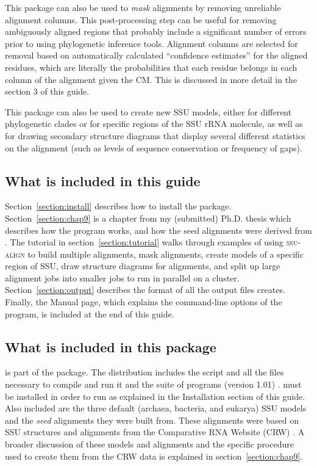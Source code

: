 This package can also be used to \emph{mask} alignments by removing
unreliable alignment columns. This post-processing step can be useful
for removing ambiguously aligned regions that probably include a
significant number of errors prior to using phylogenetic inference
tools.  Alignment columns are selected for removal based on
automatically calculated ``confidence estimates'' for the aligned
residues, which are literally the probabilities that each residue belongs
in each column of the alignment given the CM. This is discussed in
more detail in the section 3 of this guide.

This package can also be used to create new SSU models, either for
different phylogenetic clades or for specific regions of the SSU rRNA
molecule, as well as for drawing secondary structure diagrams that
display several different statistics on the alignment (such as levels
of sequence conservation or frequency of gaps). 

\subsection{What is included in this guide}

Section~\ref{section:install} describes how to install the
package. Section~\ref{section:chap9} is a chapter from my (submitted)
Ph.D. thesis \cite{Nawrocki09b} which describes how the program works,
and how the seed alignments were derived from 
\cite{CannoneGutell02}.  The tutorial in
section~\ref{section:tutorial} walks through examples of using
\textsc{ssu-align} to build multiple alignments, mask alignments,
create models of a specific region of SSU, draw structure diagrams for
alignments, and split up large alignment jobs into smaller jobs to run
in parallel on a cluster.  Section~\ref{section:output} describes the
format of all the output files  creates. Finally, the
 Manual page, which explains the command-line options of
the program, is included at the end of this guide.

\subsection{What is included in this package}

 is part of the  package. The
 distribution includes the  script
 and all the files necessary to compile and run it
and the  suite of programs (version 1.01)
\cite{Nawrocki09}.  must be installed in order to
run  as explained in the Installation section of
this guide. Also included are the three default (archaea, bacteria,
and eukarya) SSU models and the \emph{seed} alignments they were built
from. These alignments were based on SSU structures and alignments
from the Comparative RNA Website (CRW) \cite{CannoneGutell02}. A
broader discussion of these models and alignments and the specific
procedure used to create them from the CRW data is explained in
section~\ref{section:chap9}.

